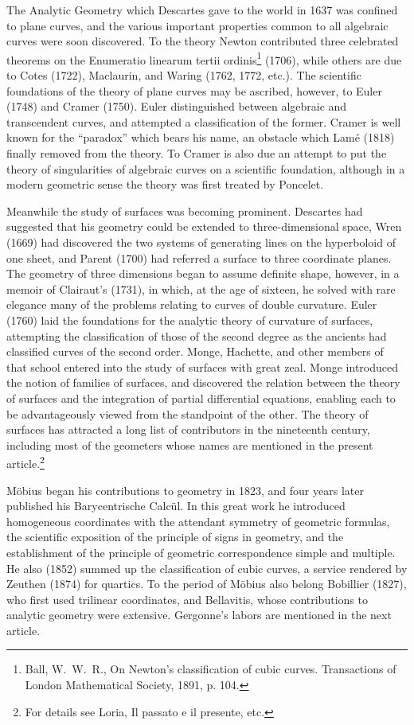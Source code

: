 \documentclass[oneside]{book}
\begin{document}
The Analytic Geometry which Descartes gave to the world in 1637 was
confined to plane curves, and the various important properties
common to all algebraic curves were soon discovered. To the theory
Newton contributed three celebrated theorems on the Enumeratio
linearum tertii ordinis\footnote{Ball, W.~W.~R., On Newton's
classification of cubic curves. Transactions of London Mathematical
Society, 1891, p. 104.} (1706), while others are due to Cotes
(1722), Maclaurin, and Waring (1762, 1772, etc.). The scientific
foundations of the theory of plane curves may be ascribed, however,
to Euler (1748) and Cramer (1750). Euler distinguished between
algebraic and transcendent curves, and attempted a classification of
the former. Cramer is well known for the ``paradox'' which bears his
name, an obstacle which Lam\'e (1818) finally removed from the
theory. To Cramer is also due an attempt to put the theory of
singularities of algebraic curves on a scientific foundation,
although in a modern geometric sense the theory was first treated by
Poncelet.

Meanwhile the study of surfaces was becoming prominent. Descartes
had suggested that his geometry could be extended to
three-dimensional space, Wren (1669) had discovered the two systems
of generating lines on the hyperboloid of one sheet, and Parent
(1700) had referred a surface to three coordinate planes. The
geometry of three dimensions began to assume definite shape,
however, in a memoir of Clairaut's (1731), in which, at the age of
sixteen, he solved with rare elegance many of the problems relating
to curves of double curvature. Euler (1760) laid the foundations
for the analytic theory of curvature of surfaces, attempting the
classification of those of the second degree as the ancients had
classified curves of the second order. Monge, Hachette, and other
members of that school entered into the study of surfaces with great
zeal. Monge introduced the notion of families of surfaces, and
discovered the relation between the theory of surfaces and the
integration of partial differential equations, enabling each to be
advantageously viewed from the standpoint of the other. The theory
of surfaces has attracted a long list of contributors in the
nineteenth century, including most of the geometers whose names are
mentioned in the present article.\footnote{For details see Loria,
Il passato e il presente, etc.}

M\"obius began his contributions to geometry in 1823, and four years
later published his Barycentrische Calc\"ul. In this great work he
introduced homogeneous coordinates with the attendant symmetry of
geometric formulas, the scientific exposition of the principle of
signs in geometry, and the establishment of the principle of
geometric correspondence simple and multiple. He also (1852) summed
up the classification of cubic curves, a service rendered by
Zeuthen (1874) for quartics. To the period of M\"obius also belong
Bobillier (1827), who first used trilinear coordinates, and
Bellavitis, whose contributions to analytic geometry were
extensive. Gergonne's labors are mentioned in the next article.
\end{document}
